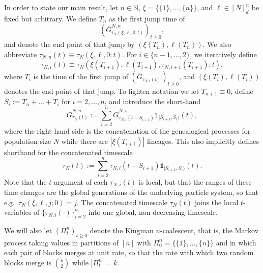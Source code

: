 \documentclass[a4paper,11pt]{article}
\theoremstyle{definition}
\newcommand{\bbN}{\mathbb{N}}
\begin{document}
In order to state our main result, let $n \in \bbN$, $\xi = \{ \{ 1 \}, \ldots, \{ n \} \}$, and $\ell \in [ N ]_d^n$ be fixed but arbitrary.
We define $T_n$ as the first jump time of 
\begin{equation*}
( \bar{ G }_{ \tau_N( \xi, \ell, 0; t ) }^{ N, n } )_{ t \geq 0 },
\end{equation*}
and denote the end point of that jump by $( \xi( T_n ), \ell( T_n ) )$.
We also abbreviate $\tau_{ N, n }( t ) \equiv \tau_N( \xi, \ell, 0; t )$.
For $i \in \{ n - 1 , \ldots, 2 \}$, we iteratively define 
\begin{equation*}
\tau_{ N, i }( t ) \equiv \tau_N( \xi( T_{ i + 1 } ), \ell( T_{ i + 1 } ), \tau_{ N, i + 1 }( T_{ i + 1 } ); t ),
\end{equation*}
where $T_i$ is the time of the first jump of $( \bar{ G }_{ \tau_{ N, i }( t ) } )_{ t \geq 0 }$, and $( \xi( T_i ), \ell( T_i ) )$ denotes the end point of that jump.
To lighten notation we let $T_{ n + 1 } \equiv 0$, define $S_i := T_n + \ldots + T_i$ for $i = 2, \ldots, n$, and introduce the short-hand
\begin{equation*}
\bar{ G }_{ \tau_N( t ) }^{ N, n } := \sum_{ i = 2 }^n \bar{G}_{ \tau_{ N, i }( t - S_{ i + 1 } ) }^{ N, i } \mathds{ 1 }_{ [ S_{ i + 1 }, S_i ) }( t ), 
\end{equation*}
where the right-hand side is the concatenation of the genealogical processes for population size $N$ while there are $| \xi( T_{ i + 1 } ) |$ lineages.
This also implicitly defines shorthand for the concatenated timescale
\begin{equation*}
\tau_N( t ) := \sum_{ i = 2 }^n \tau_{ N, i }( t - S_{ i + 1 } ) \mathds{ 1 }_{ [ S_{ i + 1 }, S_i ) }( t ).
\end{equation*}
Note that the $t$-argument of each $\tau_{N, i}(t)$ is local, but that the ranges of these time changes are the global generations of the underlying particle system, so that e.g.\ $\tau_N( \xi, \ell, j; 0) = j$.
The concatenated timescale $\tau_N(t)$ joins the local $t$-variables of $\{ \tau_{N, i}( \cdot ) \}_{i = 2}^n$ into one global, non-decreasing timescale.

We will also let $( \Pi_t^n )_{ t \geq 0 }$ denote the Kingman $n$-coalescent, that is, the Markov process taking values in partitions of $[n]$ with $\Pi_0^n = \{ \{ 1 \}, \ldots, \{ n \} \}$ and in which each pair of blocks merges at unit rate, so that the rate with which two random blocks merge is $\binom{k}{2}$ while $| \Pi_t^n | = k$.
\end{document}
